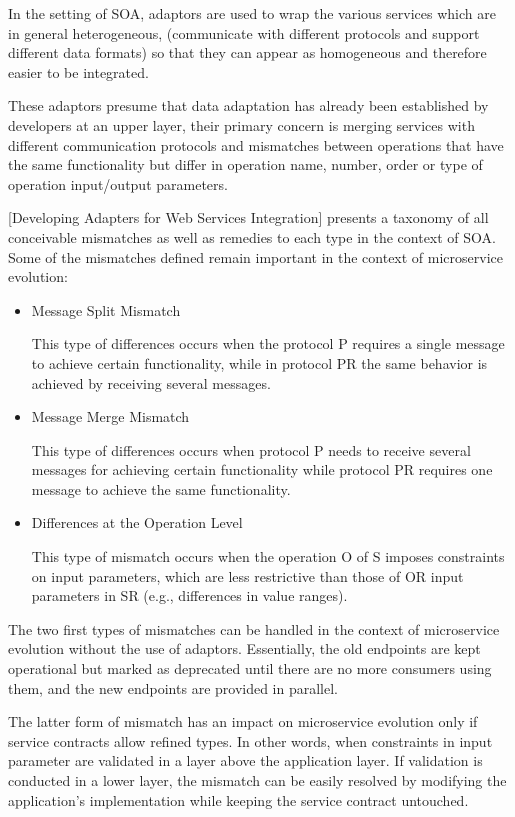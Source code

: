In the setting of SOA, adaptors are used to wrap the various services which are in general heterogeneous,
(communicate with different protocols and support different data formats) so that they can appear as homogeneous and therefore easier to be integrated.

These adaptors presume that data adaptation has already been established by developers at an upper layer,
their primary concern is merging services with different communication protocols and mismatches between operations that have the
same functionality but differ in operation name, number, order or type of operation input/output parameters.

[Developing Adapters for Web Services Integration] presents a taxonomy of all conceivable mismatches as well as remedies to each type in the context of SOA.
Some of the mismatches defined remain important in the context of microservice evolution:
\begin{itemize}
    \item Message Split Mismatch

    This type of differences occurs when the protocol P requires a single message to achieve certain functionality, while in protocol PR the same behavior is achieved by receiving several messages.
    \item Message Merge Mismatch

    This type of differences occurs when protocol P needs to receive several messages for achieving certain
    functionality while protocol PR requires one message to achieve the same functionality.
    \item Differences at the Operation Level

    This type of mismatch occurs when the operation O of S imposes constraints on input parameters,
    which are less restrictive than those of OR input parameters in SR (e.g., differences in value ranges).
\end{itemize}

The two first types of mismatches can be handled in the context of microservice evolution without the use of adaptors.
Essentially, the old endpoints are kept operational but marked as deprecated until there are no more consumers using them, and the new endpoints are provided in parallel.

The latter form of mismatch has an impact on microservice evolution only if service contracts allow refined types.
In other words, when constraints in input parameter are validated in a layer above the application layer.
If validation is conducted in a lower layer, the mismatch can be easily resolved by modifying the application's implementation while keeping the service contract untouched.
